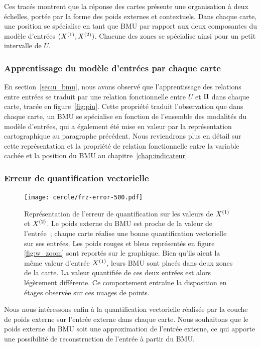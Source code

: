 \documentclass[../main]{subfiles}
\begin{document}
Ces tracés montrent que la réponse des cartes présente une organisation à deux échelles, portée par la forme des poids externes et contextuels. 
Dans chaque carte, une position se spécialise en tant que BMU par rapport aux deux composantes du modèle d'entrées $(X^{({1})}, X^{({2})})$. Chacune des zones se spécialise ainsi pour un petit intervalle de $U$.

\subsubsection{Apprentissage du modèle d'entrées par chaque carte}

En section~\ref{sec:u_bmu}, nous avons observé que l'apprentissage des relations entre entrées se traduit par une relation fonctionnelle entre $U$ et $\Pi$ dans chaque carte, tracée en figure~\ref{fig:piu}.
Cette propriété traduit l'observation que dans chaque carte, un BMU se spécialise en fonction de l'ensemble des modalités du modèle d'entrées, qui a également été mise en valeur par la représentation cartographique au paragraphe précédent. Nous reviendrons plus en détail sur cette représentation et la propriété de relation fonctionnelle entre la variable cachée et la position du BMU au chapitre~\ref{chap:indicateur}.

\subsubsection{Erreur de quantification vectorielle}

\begin{figure}
	\centering\texttt{[image: cercle/frz-error-500.pdf]}
	\caption{Représentation de l'erreur de quantification sur les valeurs de $X^{({1})}$ et $X^{({2})}$. Le poids externe du BMU est proche de la valeur de l'entrée~; chaque carte réalise une bonne quantification vectorielle sur ses entrées. 
	Les poids rouges et bleus représentés en figure \ref{fig:w_zoom} sont reportés sur le graphique. Bien qu'ils aient la même valeur d'entrée $X^{({1})}$, leurs BMU sont placés dans deux zones de la carte. La valeur quantifiée de ces deux entrées est alors légèrement différente. Ce comportement entraîne la disposition en étages observée sur ces nuages de points. \label{fig:qv}}
\end{figure}

Nous nous intéressons enfin à la quantification vectorielle réalisée par la couche de poids externe sur l'entrée externe dans chaque carte. Nous souhaitons que le poids externe du BMU soit une approximation de l'entrée externe, ce qui apporte une possibilité de reconstruction de l'entrée à partir du BMU.
\end{document}
